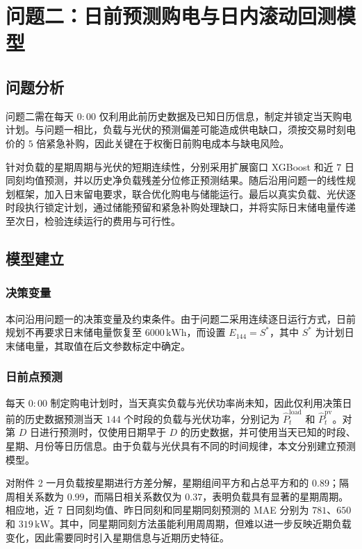 \section{问题二：日前预测购电与日内滚动回测模型}

\subsection{问题分析}

问题二需在每天 $0{:}00$ 仅利用此前历史数据及已知日历信息，制定并锁定当天购电计划。与问题一相比，负载与光伏的预测偏差可能造成供电缺口，须按交易时刻电价的 $5$ 倍紧急补购，因此关键在于权衡日前购电成本与缺电风险。

针对负载的星期周期与光伏的短期连续性，分别采用扩展窗口 XGBoost 和近 $7$ 日同刻均值预测，并以历史净负载残差分位修正预测结果。随后沿用问题一的线性规划框架，加入日末留电要求，联合优化购电与储能运行。最后以真实负载、光伏逐时段执行锁定计划，通过储能预留和紧急补购处理缺口，并将实际日末储电量传递至次日，检验连续运行的费用与可行性。

\subsection{模型建立}

\subsubsection{决策变量}

本问沿用问题一的决策变量及约束条件。由于问题二采用连续逐日运行方式，日前规划不再要求日末储电量恢复至 $6000\,\mathrm{kWh}$，而设置 $E_{144}=S^{*}$，其中 $S^{*}$ 为计划日末储电量，其取值在后文参数标定中确定。

\subsubsection{日前点预测}

每天 $0{:}00$ 制定购电计划时，当天真实负载与光伏功率尚未知，因此仅利用决策日前的历史数据预测当天 $144$ 个时段的负载与光伏功率，分别记为 $\hat P^{\mathrm{load}}_{t}$ 和 $\hat P^{\mathrm{pv}}_{t}$。对第 $D$ 日进行预测时，仅使用日期早于 $D$ 的历史数据，并可使用当天已知的时段、星期、月份等日历信息。由于负载与光伏具有不同的时间规律，本文分别建立预测模型。


对附件 2 一月负载按星期进行方差分解，星期组间平方和占总平方和的 $0.89$；隔周相关系数为 $0.99$，而隔日相关系数仅为 $0.37$，表明负载具有显著的星期周期。相应地，近 $7$ 日同刻均值、昨日同刻和同星期同刻预测的 MAE 分别为 $781$、$650$ 和 $319\,\mathrm{kW}$。其中，同星期同刻方法虽能利用周周期，但难以进一步反映近期负载变化，因此需要同时引入星期信息与近期历史特征。


